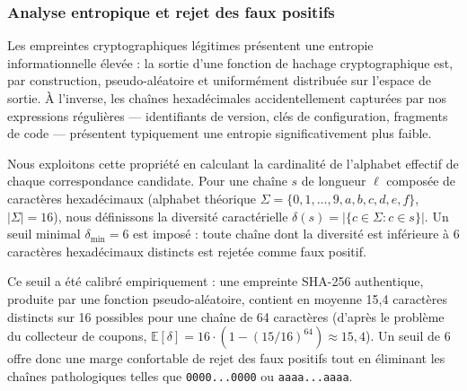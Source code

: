 \subsubsection{Analyse entropique et rejet des faux positifs}

Les empreintes cryptographiques légitimes présentent une entropie informationnelle élevée : la sortie d'une fonction de hachage cryptographique est, par construction, pseudo-aléatoire et uniformément distribuée sur l'espace de sortie. À l'inverse, les chaînes hexadécimales accidentellement capturées par nos expressions régulières --- identifiants de version, clés de configuration, fragments de code --- présentent typiquement une entropie significativement plus faible.

Nous exploitons cette propriété en calculant la cardinalité de l'alphabet effectif de chaque correspondance candidate. Pour une chaîne $s$ de longueur $\ell$ composée de caractères hexadécimaux (alphabet théorique $\Sigma = \{0, 1, \ldots, 9, a, b, c, d, e, f\}$, $|\Sigma| = 16$), nous définissons la diversité caractérielle $\delta(s) = |\{c \in \Sigma : c \in s\}|$. Un seuil minimal $\delta_{\min} = 6$ est imposé : toute chaîne dont la diversité est inférieure à 6 caractères hexadécimaux distincts est rejetée comme faux positif.

Ce seuil a été calibré empiriquement : une empreinte SHA-256 authentique, produite par une fonction pseudo-aléatoire, contient en moyenne 15{,}4 caractères distincts sur 16 possibles pour une chaîne de 64 caractères (d'après le problème du collecteur de coupons, $\mathbb{E}[\delta] = 16 \cdot (1 - (15/16)^{64}) \approx 15{,}4$). Un seuil de 6 offre donc une marge confortable de rejet des faux positifs tout en éliminant les chaînes pathologiques telles que \texttt{0000...0000} ou \texttt{aaaa...aaaa}.

